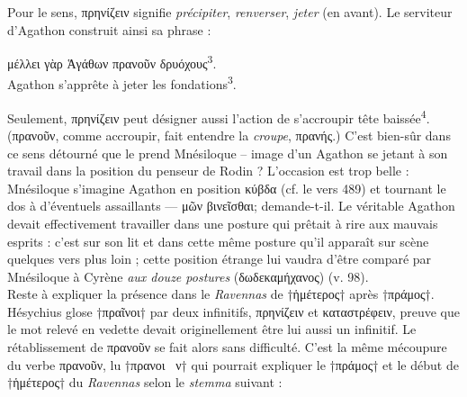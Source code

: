 \documentclass[12pt]{book}%
\newcommand{\italique}[1]{\textit{#1}}%
\newcommand{\citComm}[1]{\begin{quoting}[vskip=0pt] #1 \end{quoting}}%
\newcommand{\allemand}[1]{{\policeAll #1}}%
\newcommand{\marqueur}[1]{\textsuperscript{#1}}%
\newenvironment{groupe}{%
\pstart%
\ledgroup%
}{%
\pend %
}%
\begin{document}
\begin{pages}
\begin{Leftside}
\begin{groupe}
{{Pour le sens, πρηνίζειν signifie \italique{précipiter}, \italique{renverser}, \italique{jeter} (en avant).
Le serviteur d'Agathon construit ainsi sa phrase :%
\citComm{μέλλει γὰρ Ἁγάθων πρανοῦν δρυόχους\marqueur{3}.\\
Agathon s'apprête à jeter les fondations\marqueur{3}.}%
Seulement, πρηνίζειν peut désigner aussi l'action de s'accroupir tête baissée\marqueur{4}. (πρανοῦν, comme accroupir, fait entendre la \italique{croupe}, πρανής.) C'est bien-sûr dans ce sens détourné que le prend Mnésiloque -- image d'un Agathon se jetant à son travail dans la position du penseur de Rodin ? L'occasion est trop belle : Mnésiloque s'imagine Agathon en position κύβδα (cf. le vers 489) et tournant le dos à d'éventuels assaillants --- μῶν βινεῖσθαι; demande-t-il. Le véritable Agathon devait effectivement travailler dans une posture qui prêtait à rire aux mauvais esprits : c'est sur son lit et dans cette même posture qu'il apparaît sur scène quelques vers plus loin ; cette position étrange lui vaudra d'être comparé par Mnésiloque à Cyrène \italique{aux douze postures} (δωδεκαμήχανος) (v. 98).\\
Reste à expliquer la présence dans le \italique{Ravennas} de †ἡμέτερος† après †πράμος†. %
Hésychius glose †πραῖνοι† par deux infinitifs, πρηνίζειν et καταστρέφειν, preuve que le mot relevé en vedette devait originellement être lui aussi un infinitif. Le rétablissement de πρανοῦν se fait alors sans difficulté. %
C'est la même mécoupure du verbe πρανοῦν, lu †πρανοι \ ν† qui pourrait expliquer le †πράμος† et le début de †ἡμέτερος† du \italique{Ravennas} selon le \italique{stemma} suivant :  %
}}
\end{groupe}
\end{Leftside}
\end{pages}
\end{document}
